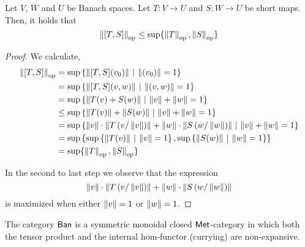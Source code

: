 \begin{lemma} \label{lem_op_max_trace}
  Let $V$, $W$ and $U$ be Banach spaces. Let $ T: V \to U$ and $ S: W \to U$ be short maps. Then, it holds that 
  $$ \left\lVert [T, S] \right\rVert_{\text{op}} \leq \sup \{\left\lVert T \right\rVert_{\text{op}},\left\lVert S \right\rVert_{\text{op}}\}$$
\end{lemma}


\begin{proof}
We calculate,
\begin{align*} 
   \left\lVert [T, S] \right\rVert_{\text{op}} &  = \sup{\{ \left\lVert [T, S] (v_0) \right\rVert   \hspace{2pt} |  \hspace{2pt}  \left\lVert (v_0) \right\rVert = 1  \}}\\
   & = \sup{\{ \left\lVert [T, S] (v, w) \right\rVert   \hspace{2pt} |  \hspace{2pt}  \left\lVert (v, w ) \right\rVert = 1  \}}  \\
   & = \sup \left\{  \left\lVert T (v) + S (w) \right\rVert  \, \vert \, \left\lVert v \right\rVert + \left\lVert w \right\rVert= 1 \right\} \\
   & \leq \sup \left\{  \left\lVert T (v) \right\rVert + \left\lVert S (w) \right\rVert  \, \vert \, \left\lVert v \right\rVert + \left\lVert w \right\rVert= 1 \right\} \\
   & = \sup \left\{ \left\lVert v \right\rVert \cdot   \left\lVert T \left( v / \left\lVert v  \right\rVert\right)  \right\rVert + \left\lVert w \right\rVert \cdot \left\lVert S \left( w / \left\lVert w \right\rVert\right) \right\rVert \, \vert \, \left\lVert v \right\rVert + \left\lVert w \right\rVert= 1  \right\}  \\
   & = \sup  \left\{ \sup \left\{\left\lVert T(v) \right\rVert   \hspace{2pt} |  \hspace{2pt}  \left\lVert v \right\rVert = 1  \right\},\sup \left\{\left\lVert S(w) \right\rVert   \hspace{2pt} |  \hspace{2pt}  \left\lVert w \right\rVert = 1   \right\}  \right\} \\
   & = \sup \{\left\lVert T \right\rVert_{\text{op}},\left\lVert S \right\rVert_{\text{op}}\}
\end{align*}

In the second to last step we observe that the expression 
\[\left\lVert v \right\rVert \cdot   \left\lVert T \left( v / \left\lVert v  \right\rVert\right)  \right\rVert + \left\lVert w \right\rVert \cdot \left\lVert S \left( w / \left\lVert w \right\rVert\right) \right\rVert \]
is maximized when either $\left\lVert v \right\rVert=1$ or $\left\lVert w \right\rVert=1$.
 
\end{proof}


\begin{theorem} \cite[Theorem 4.3]{dahlqvist2023syntactic} \label{thm:ban_monoidal_met}
      The category $\mathsf{Ban}$ is a  symmetric monoidal closed $\mathsf{Met}$-category in which both the tensor product and the internal hom-functor (currying) are non-expansive.
  \end{theorem}

